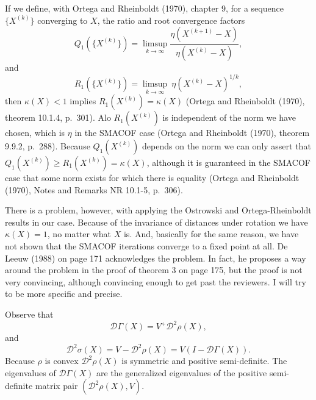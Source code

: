 \documentclass[
  12pt,
]{article}
\begin{document}
If we define, with Ortega and Rheinboldt (1970), chapter 9, for a sequence \(\{X^{(k)}\}\) converging to \(X\), the ratio and root convergence factors
\begin{equation}
Q_1(\{X^{(k)}\})=\limsup_{k\rightarrow\infty}\frac{\eta(X^{(k+1)}-X)}{\eta(X^{(k)}-X)},
\end{equation}
and
\begin{equation}
R_1(\{X^{(k)}\})=\limsup_{k\rightarrow\infty}\ \eta(X^{(k)}-X)^{1/k},
\end{equation}
then \(\kappa(X)<1\) implies \(R_1(X^{(k)})=\kappa(X)\) (Ortega and Rheinboldt (1970), theorem 10.1.4, p.~301). Alo \(R_1(X^{(k)})\) is independent of the norm we have chosen, which is \(\eta\) in the SMACOF case (Ortega and Rheinboldt (1970), theorem 9.9.2, p.~288). Because \(Q_1(X^{(k)})\) depends on the norm we can only assert that
\(Q_1(X^{(k)})\geq R_1(X^{(k)})=\kappa(X)\), although it is guaranteed in the SMACOF case that some norm exists for which there is equality (Ortega and Rheinboldt (1970), Notes and Remarks NR 10.1-5, p.~306).

There is a problem, however, with applying the Ostrowski and Ortega-Rheinboldt results in our case. Because of the invariance of distances under rotation we have \(\kappa(X)=1\), no matter what \(X\) is. And, basically for the same reason, we have not shown that the SMACOF iterations converge to a fixed point at all. De Leeuw (1988) on page 171 acknowledges the problem. In fact, he proposes a way around the problem in the proof of theorem 3 on page 175, but the proof is not very convincing, although convincing enough to get past the reviewers. I will try to be more specific and precise.

Observe that
\begin{equation}
\mathcal{D}\Gamma(X)=V^+\mathcal{D}^2\rho(X),
\label{eq:dgamma}
\end{equation}
and
\begin{equation}
\mathcal{D}^2\sigma(X)=V-\mathcal{D}^2\rho(X)=V(I-\mathcal{D}\Gamma(X)).
\label{eq:d2sigma}
\end{equation}
Because \(\rho\) is convex \(\mathcal{D}^2\rho(X)\) is symmetric and positive semi-definite.
The eigenvalues of \(\mathcal{D}\Gamma(X)\) are the generalized eigenvalues of the positive semi-definite matrix pair \((\mathcal{D}^2\rho(X),V)\).
\end{document}
